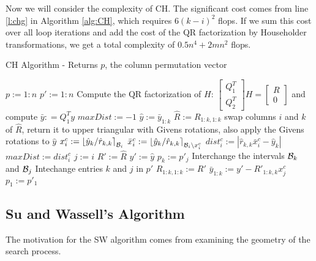 \documentclass[conference]{IEEEtran}
\newcommand{\bsmx}{\left[\begin{smallmatrix}}
\newcommand{\esmx}{\end{smallmatrix}\right]}
\begin{document}
Now we will consider the complexity of CH. The 
significant cost comes from line \ref{l:chg} in Algorithm \ref{alg:CH},
which requires $6(k-i)^2$ flops.
If we sum this cost over all loop iterations and add the cost of the QR factorization by Householder transformations, 
we  get a total complexity of $0.5n^4+2mn^2$ flops.

\begin{algorithm}
\caption{CH Algorithm - Returns $p$, the column permutation vector}
\label{alg:CH}
\begin{algorithmic}[1]
\STATE $p := 1:n$
\STATE $p' := 1:n$
\STATE Compute the QR factorization of $H$: $\bsmx Q_1^T \\ Q_2^T \esmx H= \bsmx R\\ 0 \esmx$
             and compute  $\bar{y} : = Q_1^Ty$
  	\STATE $maxDist := -1$
    	\STATE $\hat{y} := \bar{y}_{1:k}$
    	\STATE $\hat{R} := R_{1:k,1:k}$
        \STATE  \label{l:chg} swap columns $i$ and $k$ of $\hat{R}$, return it  to upper
triangular with Givens rotations, also apply the Givens rotations to $\hat{y}$ %
        \STATE $x_i^c := \left \lfloor\hat{y}_k/\hat{r}_{k,k}\right
\rceil_{{\cal B}_i}$
        \STATE $\bar{x}_i^c := \left \lfloor\hat{y}_k/\hat{r}_{k,k}\right
\rceil_{{\cal B}_i\backslash x_i^c}$
        \STATE $dist_i^c := \left | \hat{r}_{k,k}\bar{x}_i^c - \hat{y}_k
\right | $
        	\STATE $maxDist := dist_i^c$
        	\STATE $j := i$
        	\STATE $R' := \hat{R}$
        	\STATE $y' := \hat{y}$
        \ENDIF
    \ENDFOR
    \STATE $p_k := p'_j$
    \STATE Interchange the intervals ${{\cal B}_k}$ and ${{\cal B}_{j}}$
    \STATE Intechange entries $k$ and $j$ in $p'$
    \STATE $R_{1:k,1:k} := R'$
    \STATE $\bar{y}_{1:k} := y' - R'_{1:k,k}x_j^c$
  \ENDFOR
  \STATE $p_1 := p'_1$
\end{algorithmic}
\end{algorithm}



\subsection{Su and Wassell's Algorithm}
The motivation for the SW algorithm comes from examining the geometry of the search process.
\end{document}
